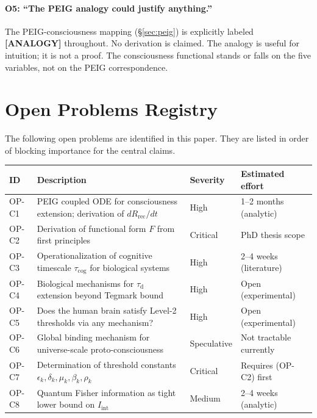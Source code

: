 \documentclass[12pt,letterpaper]{article}
\newcommand{\ANALOGY}[1]{\textcolor{orange!70!black}{\textbf{[ANALOGY]}} #1}
\newcommand{\Iint}{I_{\mathrm{int}}}
\newcommand{\Rrec}{R_{\mathrm{rec}}}
\newcommand{\taud}{\tau_{\mathrm{d}}}
\newcommand{\taucog}{\tau_{\mathrm{cog}}}
\begin{document}
\paragraph{O5: ``The PEIG analogy could justify anything.''}
The PEIG-consciousness mapping (\S\ref{sec:peig}) is explicitly labeled
\ANALOGY{} throughout. No derivation is claimed. The analogy is useful for
intuition; it is not a proof. The consciousness functional stands or falls
on the five variables, not on the PEIG correspondence.

\section{Open Problems Registry}
\label{sec:open}

The following open problems are identified in this paper. They are listed
in order of blocking importance for the central claims.

\begin{center}
\begin{tabular}{p{1.3cm} p{5cm} p{2cm} p{3.5cm}}
\toprule
\textbf{ID} & \textbf{Description} & \textbf{Severity} & \textbf{Estimated effort} \\
\midrule
OP-C1 & PEIG coupled ODE for consciousness extension; derivation of $d\Rrec/dt$ &
  High & 1--2 months (analytic) \\
OP-C2 & Derivation of functional form $F$ from first principles &
  Critical & PhD thesis scope \\
OP-C3 & Operationalization of cognitive timescale $\taucog$ for biological systems &
  High & 2--4 weeks (literature) \\
OP-C4 & Biological mechanisms for $\taud$ extension beyond Tegmark bound &
  High & Open (experimental) \\
OP-C5 & Does the human brain satisfy Level-2 thresholds via any mechanism? &
  High & Open (experimental) \\
OP-C6 & Global binding mechanism for universe-scale proto-consciousness &
  Speculative & Not tractable currently \\
OP-C7 & Determination of threshold constants $\epsilon_k, \delta_k, \mu_k, \beta_k, \rho_k$ &
  Critical & Requires (OP-C2) first \\
OP-C8 & Quantum Fisher information as tight lower bound on $\Iint$ &
  Medium & 2--4 weeks (analytic) \\
\bottomrule
\end{tabular}
\end{center}
\end{document}
